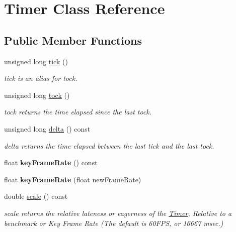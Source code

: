 \hypertarget{class_timer}{\section{Timer Class Reference}
\label{class_timer}
}
\subsection*{Public Member Functions}
\begin{DoxyCompactItemize}
\item 
unsigned long \hyperlink{class_timer_a303b48cd096028dbcc3d73f735c49b66}{tick} ()
\begin{DoxyCompactList}\small\item\em tick is an alias for tock. \end{DoxyCompactList}\item 
unsigned long \hyperlink{class_timer_a334900b3056fd3351c299fef28c31d3d}{tock} ()
\begin{DoxyCompactList}\small\item\em tock returns the time elapsed since the last tock. \end{DoxyCompactList}\item 
unsigned long \hyperlink{class_timer_a855136dd9e8cc3c07278dac9c4613693}{delta} () const 
\begin{DoxyCompactList}\small\item\em delta returns the time elapsed between the last tick and the last tock. \end{DoxyCompactList}\item 
\hypertarget{class_timer_a86957c3647a68e4d1666b4dc8765a631}{float {\bfseries key\-Frame\-Rate} () const }\label{class_timer_a86957c3647a68e4d1666b4dc8765a631}

\item 
\hypertarget{class_timer_ab49d5d4d56cfff329d3f3f4c74663ae2}{float {\bfseries key\-Frame\-Rate} (float new\-Frame\-Rate)}\label{class_timer_ab49d5d4d56cfff329d3f3f4c74663ae2}

\item 
double \hyperlink{class_timer_a7b3934948b0d2bc11a5e198e619b2576}{scale} () const 
\begin{DoxyCompactList}\small\item\em scale returns the relative lateness or eagerness of the \hyperlink{class_timer}{Timer}, Relative to a benchmark or Key Frame Rate (The default is 60\-F\-P\-S, or 16667 msec.) \end{DoxyCompactList}\end{DoxyCompactItemize}
